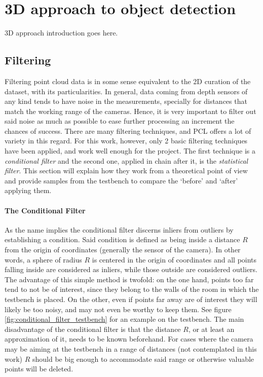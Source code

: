 \documentclass[../main.tex]{subfiles}
\begin{document}
\section{3D approach to object detection} \label{sec:3D_approach}
3D approach introduction goes here.

\subsection{Filtering}
Filtering point cloud data is in some sense equivalent to the 2D curation of the dataset, with its particularities. In general, data coming from depth sensors of any kind tends to have noise in the measurements, specially for distances that match the working range of the cameras. Hence, it is very important to filter out said noise as much as possible to ease further processing an increment the chances of success. There are many filtering techniques, and PCL offers a lot of variety in this regard. For this work, however, only 2 basic filtering techniques have been applied, and work well enough for the project. The first technique is a \emph{conditional filter} and the second one, applied in chain after it, is the \emph{statistical filter}. This section will explain how they work from a theoretical point of view and provide samples from the testbench to compare the `before' and `after' applying them.

\paragraph{The Conditional Filter}
As the name implies the conditional filter discerns inliers from outliers by establishing a condition. Said condition is defined as being inside a distance $R$ from the origin of coordinates (generally the sensor of the camera). In other words, a sphere of radius $R$ is centered in the origin of coordinates and all points falling inside are considered as inliers, while those outside are considered outliers. The advantage of this simple method is twofold: on the one hand, points too far tend to not be of interest, since they belong to the walls of the room in which the testbench is placed. On the other, even if points far away are of interest they will likely be too noisy, and may not even be worthy to keep them. See figure \ref{fig:conditional_filter_testbench} for an example on the testbench. The main disadvantage of the conditional filter is that the distance $R$, or at least an approximation of it, needs to be known beforehand. For cases where the camera may be aiming at the testbench in a range of distances (not contemplated in this work) $R$ should be big enough to accommodate said range or otherwise valuable points will be deleted.
\end{document}
